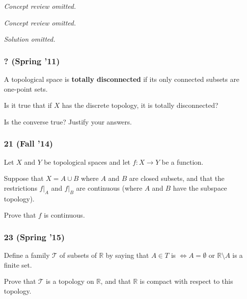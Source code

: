 \emph{Concept review omitted.}

\emph{Concept review omitted.}

\emph{Solution omitted.}

\hypertarget{spring-11}{%
\subsubsection{? (Spring '11)}\label{spring-11}}

\begin{problem}[?]

A topological space is \textbf{totally disconnected} if its only
connected subsets are one-point sets.

Is it true that if \(X\) has the discrete topology, it is totally
disconnected?

Is the converse true? Justify your answers.

\end{problem}

\hypertarget{fall-14}{%
\subsubsection{21 (Fall '14)}\label{fall-14}}

\begin{problem}[?]

Let \(X\) and \(Y\) be topological spaces and let \(f : X \to Y\) be a
function.

Suppose that \(X = A \cup B\) where \(A\) and \(B\) are closed subsets,
and that the restrictions \(f \mathrel{\Big|}_A\) and
\(f \mathrel{\Big|}_B\) are continuous (where \(A\) and \(B\) have the
subspace topology).

Prove that \(f\) is continuous.

\end{problem}

\hypertarget{spring-15}{%
\subsubsection{23 (Spring '15)}\label{spring-15}}

\begin{problem}[?]

Define a family \({\mathcal{T}}\) of subsets of \({\mathbb{R}}\) by
saying that \(A \in T\) is \(\iff A = \emptyset\) or
\({\mathbb{R}}\setminus A\) is a finite set.

Prove that \({\mathcal{T}}\) is a topology on \({\mathbb{R}}\), and that
\({\mathbb{R}}\) is compact with respect to this topology.

\end{problem}

